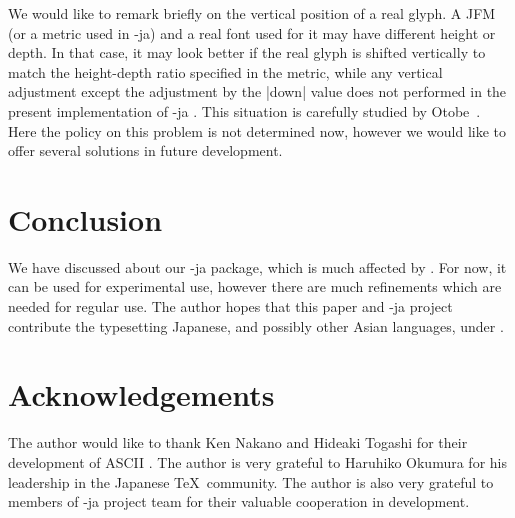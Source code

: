 \documentclass{ajt}
\begin{document}
We would like to remark briefly on the vertical position of a real
glyph.  A JFM (or a metric used in \LuaTeX-ja) and a real font used for
it may have different height or depth.  In that case, it may look better
if the real glyph is shifted vertically to match the height-depth ratio
specified in the metric, while any vertical adjustment except the
adjustment by the |down| value does not performed in the present
implementation of \LuaTeX-ja . This situation is carefully studied by
Otobe~\cite{min10}. Here the policy on this problem is not determined
now, however we would like to offer several solutions in future
development.

\section{Conclusion}
We have discussed about our \LuaTeX-ja package, which is much affected
by \pTeX. For now, it can be used for experimental use, however there
are much refinements which are needed for regular use. The author hopes
that this paper and \LuaTeX-ja project contribute the typesetting Japanese,
and possibly other Asian languages, under \LuaTeX.

\section*{Acknowledgements}
The author would like to thank Ken Nakano and Hideaki Togashi for their
development of ASCII \pTeX.  The author is very grateful to Haruhiko
Okumura for his leadership in the Japanese \TeX\ community. The author
is also very grateful to members of \LuaTeX-ja project team for their
valuable cooperation in development.
\end{document}
